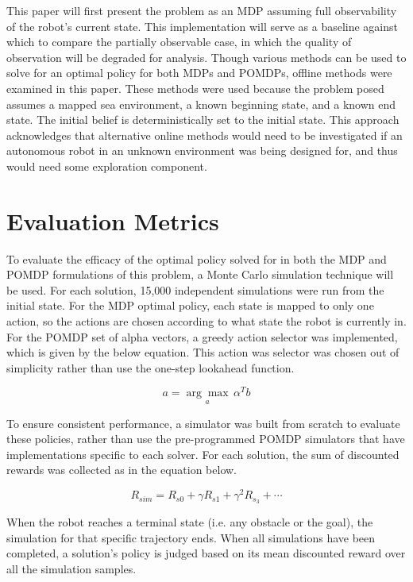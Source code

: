 \documentclass{article}
\begin{document}
This paper will first present the problem as an MDP assuming full observability of the robot's current state. This implementation will serve as a baseline against which to compare the partially observable case, in which the quality of observation will be degraded for analysis. Though various methods can be used to solve for an optimal policy for both MDPs and POMDPs, offline methods were examined in this paper.  These methods were used because the problem posed assumes a mapped sea environment, a known beginning state, and a known end state. The initial belief is deterministically set to the initial state. This approach acknowledges that alternative online methods would need to be investigated if an autonomous robot in an unknown environment was being designed for, and thus would need some exploration component.

\section*{Evaluation Metrics}
To evaluate the efficacy of the optimal policy solved for in both the MDP and POMDP formulations of this problem, a Monte Carlo simulation technique will be used. For each solution, 15,000 independent simulations were run from the initial state.  For the MDP optimal policy, each state is mapped to only one action, so the actions are chosen according to what state the robot is currently in. For the POMDP set of alpha vectors, a greedy action selector was implemented, which is given by the below equation. This action was selector was chosen out of simplicity rather than use the one-step lookahead function.

\begin{equation}\label{greedyaction}
    a = \underset{a}{\arg\max}\,\alpha^Tb
\end{equation}

To ensure consistent performance, a simulator was built from scratch to evaluate these policies, rather than use the pre-programmed POMDP simulators that have implementations specific to each solver. For each solution, the sum of discounted rewards was collected as in the equation below.

\begin{equation}\label{discountreward}
    R_{sim} = R_{s0} + \gamma R_{s1} + \gamma^2 R_{s_3} + \cdots
\end{equation}

When the robot reaches a terminal state (i.e. any obstacle or the goal), the simulation for that specific trajectory ends. When all simulations have been completed, a solution's policy is judged based on its mean discounted reward over all the simulation samples.
\end{document}

